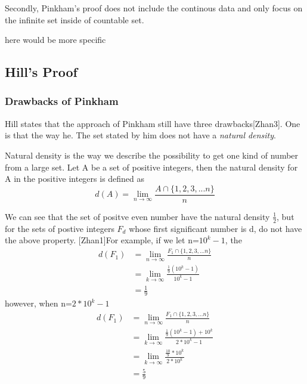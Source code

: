 \documentclass[12pt]{article}
\begin{document}
Secondly, Pinkham's proof does not include the continous data and only focus on the infinite set inside of countable set. 

here would be more specific
\subsection{Hill's Proof}
\subsubsection{Drawbacks of Pinkham}
Hill states that the approach of Pinkham still have three drawbacks[Zhan3]. One is that the way he.  The set stated by him does not  have a  \emph{natural density}.

Natural density is the way we describe the possibility to get one kind of number from a large set. Let A be a set of positive integers, then the natural density for A in the positive integers is defined as 
$$d(A)=\lim_{n\to \infty}\frac{A\cap\{1,2,3,...n\}}{n}$$

We can see that the set of positve even number have the natural density $\frac12$, but for the sets of postive integers $F_d$ whose first significant number is d, do not have the above property. [Zhan1]For example, if we let n=$10^k-1$, the
\begin{equation*}
\begin{aligned}
d(F_1)&=\lim_{n\to \infty}\frac{F_1\cap\{1,2,3,...n\}}{n}\\
&=\lim_{k\to \infty}\frac{\frac19(10^k-1)}{10^k-1}\\
&=\frac19
\end{aligned}
\end{equation*}
however, when n=$2*10^k-1$
\begin{equation*}
\begin{aligned}
d(F_1)&=\lim_{n\to \infty}\frac{F_1\cap\{1,2,3,...n\}}{n}\\
&=\lim_{k\to \infty}\frac{\frac19(10^k-1)+10^k}{2*10^k-1}\\
&=\lim_{k\to \infty}\frac{\frac{10}9*10^k}{2*10^k}\\
&=\frac59
\end{aligned}
\end{equation*}
\end{document}
